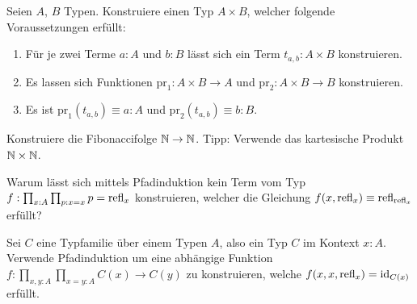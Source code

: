 \documentclass{uebung}
\begin{document}
\begin{exercise}
  Seien $A$, $B$ Typen.
  Konstruiere einen Typ $A\times B$, welcher folgende Voraussetzungen erfüllt:
  \begin{enumerate}
    \item Für je zwei Terme $a:A$ und $b:B$ lässt sich ein Term $t_{a,b}:A\times B$ konstruieren.
    \item Es lassen sich Funktionen $\mathrm{pr}_1:A \times B\to A$ und $\mathrm{pr}_2:A\times B\to B$ konstruieren.
    \item Es ist $\mathrm{pr}_1(t_{a,b})\equiv a:A$ und $\mathrm{pr}_2(t_{a,b})\equiv b:B$.
  \end{enumerate}
\end{exercise}

\begin{exercise}[Fibonacci]
  Konstruiere die Fibonaccifolge $\mathbb{N}\to\mathbb{N}$.
  {\tiny Tipp: Verwende das kartesische Produkt $\mathbb{N}\times\mathbb{N}$.}
\end{exercise}

\begin{exercise}
  Warum lässt sich mittels Pfadinduktion kein Term vom Typ $f:\prod_{x:A}\prod_{p:x=x}p=\mathrm{refl}_x$ konstruieren, welcher die Gleichung $f(x,\mathrm{refl}_x)\equiv \mathrm{refl}_{\mathrm{refl}_x}$ erfüllt?
\end{exercise} 

\begin{exercise}
  Sei $C$ eine Typfamilie über einem Typen $A$, also ein Typ $C$ im Kontext $x:A$.
  Verwende Pfadinduktion um eine abhängige Funktion $f:\prod_{x,y:A}\prod_{x=y:A} C(x)\to C(y)$ zu konstruieren, welche $f(x,x,\mathrm{refl}_x)=\mathrm{id}_{C(x)}$ erfüllt.
\end{exercise}
\end{document}
